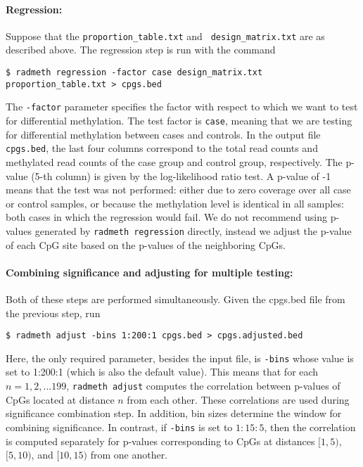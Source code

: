 \documentclass[10pt]{article}
\begin{document}
\paragraph{Regression:} Suppose that the {\tt proportion\_table.txt} and {\tt 
design\_matrix.txt} are as described above. The regression step is run with 
the command

{\small{%
\begin{verbatim}
$ radmeth regression -factor case design_matrix.txt proportion_table.txt > cpgs.bed
\end{verbatim}%
}}

The {\tt -factor} parameter specifies the factor with respect to which we
want to test for differential methylation. The test factor is {\tt case},
meaning that we are testing for differential methylation between cases and 
controls.
In the output file {\tt cpgs.bed},
the last four columns correspond to the total read counts and
methylated read counts of the case group and control group, respectively.
The p-value (5-th column) is given by the log-likelihood ratio test. A
p-value of -1 means that the test was not performed: either due to zero
coverage over all case or control samples, or because the methylation level
is identical in all samples: both cases in which the regression would fail.
We do not recommend using p-values generated by {\tt radmeth regression} directly,
instead we adjust the p-value of each CpG site based on the p-values of the
neighboring CpGs.

\paragraph{Combining significance and adjusting for multiple testing:} Both
of these steps are performed simultaneously. Given the cpgs.bed file from 
the previous step, run

{\small{%
\begin{verbatim}
$ radmeth adjust -bins 1:200:1 cpgs.bed > cpgs.adjusted.bed
\end{verbatim}%
}}

Here, the only required parameter, besides the input file, is {\tt -bins}
whose value is set to 1:200:1 (which is also the default value). This means
that for  each $n = 1, 2, . . . 199$, {\tt radmeth adjust} computes the
correlation between p-values of CpGs located at distance $n$ from each other.
These correlations are used during significance combination step. In
addition, bin sizes determine the window for combining significance. In
contrast, if {\tt -bins} is set to $1:15:5$, then the correlation is computed
separately for p-values corresponding to CpGs at distances $[1, 5)$, $[5,
10)$, and $[10, 15)$ from one another.
\end{document}
